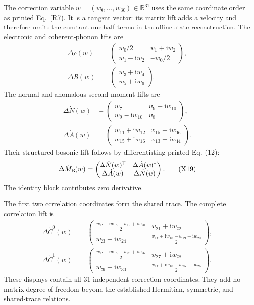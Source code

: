 \documentclass[10pt,letterpaper,twocolumn]{article}
\newcommand{\R}{\mathbb R}
\newcommand{\ii}{\mathrm i}
\begin{document}
The correction variable \(w=(w_0,\ldots,w_{30})\in\R^{31}\) uses the same
coordinate order as printed Eq.~(R7).  It is a tangent vector: its matrix lift
adds a velocity and therefore omits the constant one-half terms in the affine
state reconstruction.  The electronic and coherent-phonon lifts are
\[
\begin{aligned}
\Delta\dot\rho(w)&=
\begin{pmatrix}
w_0/2&w_1+\ii w_2\\w_1-\ii w_2&-w_0/2
\end{pmatrix},\\[2pt]
\Delta\dot B(w)&=
\begin{pmatrix}w_3+\ii w_4\\w_5+\ii w_6\end{pmatrix}.
\end{aligned}
\tag{X17}
\]
The normal and anomalous second-moment lifts are
\[
\begin{aligned}
\Delta\dot N(w)&=
\begin{pmatrix}
w_7&w_9+\ii w_{10}\\w_9-\ii w_{10}&w_8
\end{pmatrix},\\
\Delta\dot A(w)&=
\begin{pmatrix}
w_{11}+\ii w_{12}&w_{15}+\ii w_{16}\\
w_{15}+\ii w_{16}&w_{13}+\ii w_{14}
\end{pmatrix}.
\end{aligned}
\tag{X18}
\]
Their structured bosonic lift follows by differentiating printed Eq.~(12):
\[
\Delta\dot M_{\rm B}(w)=
\begin{pmatrix}
\Delta\dot N(w)^{\mathsf T}&\Delta\dot A(w)^\ast\\
\Delta\dot A(w)&\Delta\dot N(w)
\end{pmatrix}.
\tag{X19}
\]
The identity block contributes zero derivative.

The first two correlation coordinates form the shared trace.  The complete
correlation lift is
{\scriptsize
\[
\begin{aligned}
\Delta\dot C^0(w)&=
\begin{pmatrix}
\frac{w_{17}+\ii w_{18}+w_{19}+\ii w_{20}}2&w_{21}+\ii w_{22}\\
w_{23}+\ii w_{24}&\frac{w_{17}+\ii w_{18}-w_{19}-\ii w_{20}}2
\end{pmatrix},\\[3pt]
\Delta\dot C^1(w)&=
\begin{pmatrix}
\frac{w_{17}+\ii w_{18}+w_{25}+\ii w_{26}}2&w_{27}+\ii w_{28}\\
w_{29}+\ii w_{30}&\frac{w_{17}+\ii w_{18}-w_{25}-\ii w_{26}}2
\end{pmatrix}.
\end{aligned}
\tag{X20}
\]
}
These displays contain all 31 independent correction coordinates.  They add
no matrix degree of freedom beyond the established Hermitian, symmetric, and
shared-trace relations.
\end{document}
